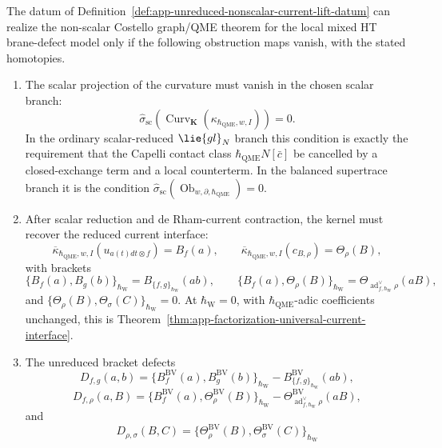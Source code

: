 \begin{prop}
\label{prop:app-nonscalar-current-lift-obstructions}
  The datum of
  Definition~\ref{def:app-unreduced-nonscalar-current-lift-datum} can
  realize the non-scalar Costello graph/QME theorem for the local mixed HT
  brane-defect model only if the following obstruction maps vanish, with
  the stated homotopies.
  \begin{enumerate}
    \item The scalar projection of the curvature must vanish in the
    chosen scalar branch:
    \[
      \widehat\sigma_{\mathrm{sc}}\!\left(
      \operatorname{Curv}_{\mathbf K}(\kappa_{\hbar_{\mathrm{QME}},w,I})
      \right)=0.
    \]
    In the ordinary scalar-reduced \(\lie{gl}_N\) branch this condition is
    exactly the requirement that the Capelli contact class
    \(\hbar_{\mathrm{QME}}N[\bar c]\) be cancelled by a closed-exchange term and a local
    counterterm.  In the balanced supertrace branch it is the condition
    \(\widehat\sigma_{\mathrm{sc}}
    (\operatorname{Ob}_{w,\partial,\hbar_{\mathrm{QME}}})=0\).
    \item After scalar reduction and de Rham-current contraction, the
    kernel must recover the reduced current interface:
    \[
      \overline{\kappa}_{\hbar_{\mathrm{QME}},w,I}
      (u_{a(t)dt\otimes f})=B_f(a),\qquad
      \overline{\kappa}_{\hbar_{\mathrm{QME}},w,I}(c_{B,\rho})=\Theta_\rho(B),
	    \]
	    with brackets
	    \[
	      \{B_f(a),B_g(b)\}_{\hbar_{\mathrm{W}}}=B_{\{f,g\}_{\hbar_{\mathrm{W}}}}(ab),\qquad
	      \{B_f(a),\Theta_\rho(B)\}_{\hbar_{\mathrm{W}}}
	        =\Theta_{\operatorname{ad}^{\vee}_{f,\hbar_{\mathrm{W}}}\rho}(aB),
	    \]
	    and \(\{\Theta_\rho(B),\Theta_\sigma(C)\}_{\hbar_{\mathrm{W}}}=0\).
	    At \(\hbar_{\mathrm{W}}=0\), with
	    \(\hbar_{\mathrm{QME}}\)-adic coefficients unchanged, this is
	    Theorem~\ref{thm:app-factorization-universal-current-interface}.
    \item The unreduced bracket defects
	    \[
	      D_{f,g}(a,b)=
	      \{B_f^{\mathrm{BV}}(a),B_g^{\mathrm{BV}}(b)\}_{\hbar_{\mathrm{W}}}
	        -B_{\{f,g\}_{\hbar_{\mathrm{W}}}}^{\mathrm{BV}}(ab),
	    \]
	    \[
	      D_{f,\rho}(a,B)=
	      \{B_f^{\mathrm{BV}}(a),\Theta_\rho^{\mathrm{BV}}(B)\}_{\hbar_{\mathrm{W}}}
	        -\Theta_{\operatorname{ad}^{\vee}_{f,\hbar_{\mathrm{W}}}\rho}^{\mathrm{BV}}(aB),
	    \]
	    and
	    \[
	      D_{\rho,\sigma}(B,C)=
	      \{\Theta_\rho^{\mathrm{BV}}(B),
	        \Theta_\sigma^{\mathrm{BV}}(C)\}_{\hbar_{\mathrm{W}}}
\]
\end{enumerate}
\end{prop}
